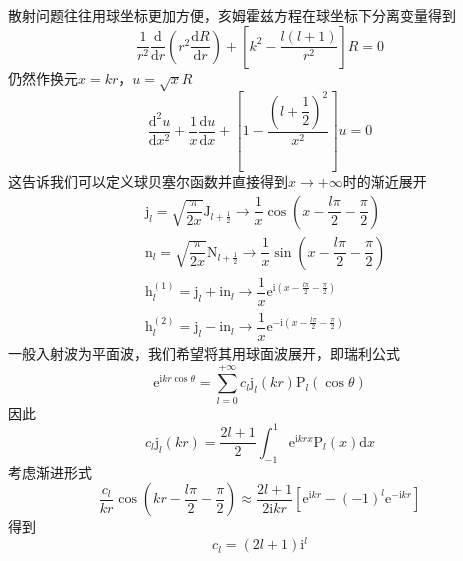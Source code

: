 \documentclass[12pt, a4paper, oneside]{ctexart}
\begin{document}
	\quad\quad 散射问题往往用球坐标更加方便，亥姆霍兹方程在球坐标下分离变量得到
	\begin{equation}
		\dfrac{1}{r^{2}}\dfrac{\mathrm{d}}{\mathrm{d}r}\left(r^{2}\dfrac{\mathrm{d}R}{\mathrm{d}r}\right)+\left[k^{2}-\dfrac{l\left(l+1\right)}{r^{2}}\right]R=0
	\end{equation}
	\quad\quad 仍然作换元$x=kr$，$u=\sqrt{x}R$
	\begin{equation}
		\dfrac{\mathrm{d}^{2}u}{\mathrm{d}x^{2}}+\dfrac{1}{x}\dfrac{\mathrm{d}u}{\mathrm{d}x}+\left[1-\dfrac{\left(l+\dfrac{1}{2}\right)^{2}}{x^{2}}\right]u=0
	\end{equation}
	\quad\quad 这告诉我们可以定义球贝塞尔函数并直接得到$x\to+\infty$时的渐近展开
	\begin{align}
		&\mathrm{j}_{l}=\sqrt{\dfrac{\pi}{2x}}\mathrm{J}_{l+\frac{1}{2}}\to\dfrac{1}{x}\cos\left(x-\dfrac{l\pi}{2}-\dfrac{\pi}{2}\right)\\
		&\mathrm{n}_{l}=\sqrt{\dfrac{\pi}{2x}}\mathrm{N}_{l+\frac{1}{2}}\to\dfrac{1}{x}\sin\left(x-\dfrac{l\pi}{2}-\dfrac{\pi}{2}\right)\\
		&\mathrm{h}_{l}^{\left(1\right)}=\mathrm{j}_{l}+\mathrm{i}\mathrm{n}_{l}\to\dfrac{1}{x}\mathrm{e}^{\mathrm{i}\left(x-\frac{l\pi}{2}-\frac{\pi}{2}\right)}\\
		&\mathrm{h}_{l}^{\left(2\right)}=\mathrm{j}_{l}-\mathrm{i}\mathrm{n}_{l}\to\dfrac{1}{x}\mathrm{e}^{-\mathrm{i}\left(x-\frac{l\pi}{2}-\frac{\pi}{2}\right)}
	\end{align}
	\quad\quad 一般入射波为平面波，我们希望将其用球面波展开，即瑞利公式
	\begin{equation}
		\mathrm{e}^{\mathrm{i}kr\cos\theta}=\sum_{l=0}^{+\infty}c_{l}\mathrm{j}_{l}\left(kr\right)\mathrm{P}_{l}\left(\cos\theta\right)
	\end{equation}
	\quad\quad 因此
	\begin{equation}
		c_{l}\mathrm{j}_{l}\left(kr\right)=\dfrac{2l+1}{2}\int_{-1}^{1}\mathrm{e}^{\mathrm{i}krx}\mathrm{P}_{l}\left(x\right)\mathrm{d}x
	\end{equation}
	\quad\quad 考虑渐进形式
	\begin{equation}
		\dfrac{c_{l}}{kr}\cos\left(kr-\dfrac{l\pi}{2}-\dfrac{\pi}{2}\right)\approx\dfrac{2l+1}{2\mathrm{i}kr}\left[\mathrm{e}^{\mathrm{i}kr}-\left(-1\right)^{l}\mathrm{e}^{-\mathrm{i}kr}\right]
	\end{equation}
	\quad\quad 得到
	\begin{equation}
		c_{l}=\left(2l+1\right)\mathrm{i}^{l}
	\end{equation}
\end{document}
